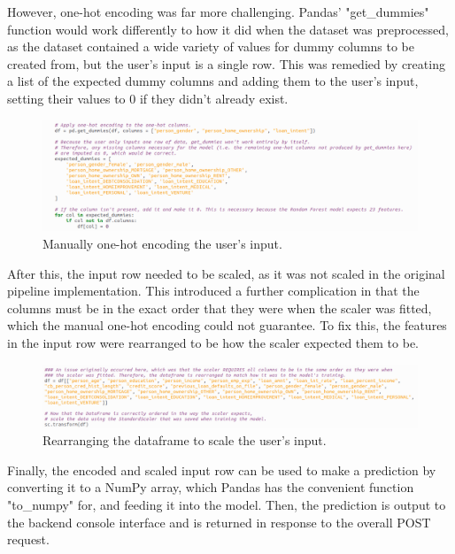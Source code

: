 \documentclass[12pt]{report}
\begin{document}
\pagebreak 
\noindent However, one-hot encoding was far more challenging. Pandas' "get\_dummies" function would work differently to how 
it did when the dataset was preprocessed, as the dataset contained a wide variety of values for dummy columns to be created from,
but the user's input is a single row. This was remedied by creating a list of the expected dummy columns and adding them to the user's 
input, setting their values to 0 if they didn't already exist.

\begin{figure}[H]
    \centering
    \includegraphics[width=\linewidth]{Implementation/JAN 10 UPDATES/NewUviEncoding2.png}
    \caption{Manually one-hot encoding the user's input.}
    \label{fig:UviOneHot}
\end{figure}

\noindent After this, the input row needed to be scaled, as it was not scaled in the original pipeline implementation.
This introduced a further complication in that the columns must be in the exact order that they were when the scaler was fitted,
which the manual one-hot encoding could not guarantee. To fix this, the features in the input row were rearranged to be how the scaler 
expected them to be.

\begin{figure}[H]
    \centering
    \includegraphics[width=\linewidth]{Implementation/JAN 10 UPDATES/DFRearrangeScale.png}
    \caption{Rearranging the dataframe to scale the user's input.}
    \label{fig:DFRearrangeScale}
\end{figure}

\noindent Finally, the encoded and scaled input row can be used to make a prediction by converting it to a NumPy array, which 
Pandas has the convenient function "to\_numpy" for, and feeding it into the model. Then, the prediction is output to the 
backend console interface and is returned in response to the overall POST request.
\end{document}
